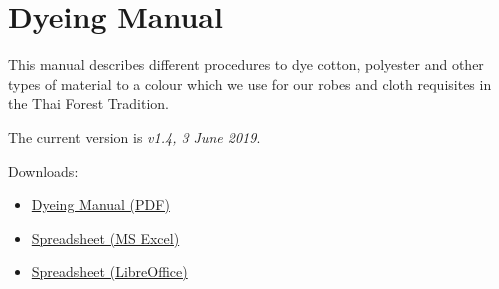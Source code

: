 \chapter{Dyeing Manual}

This manual describes different procedures to dye cotton, polyester and
other types of material to a colour which we use for our robes and cloth
requisites in the Thai Forest Tradition.

The current version is \emph{v1.4, 3 June 2019}.

Downloads:

\begin{itemize}
\tightlist
\item
  \href{https://ticivara.github.io/dyeing-manual/Dyeing-Manual.pdf}{Dyeing
  Manual (PDF)}
\item
  \href{https://ticivara.github.io/dyeing-manual/Dyeing-Manual-Excel.xlsx}{Spreadsheet
  (MS Excel)}
\item
  \href{https://ticivara.github.io/dyeing-manual/Dyeing-Manual.ods}{Spreadsheet
  (LibreOffice)}
\end{itemize}

